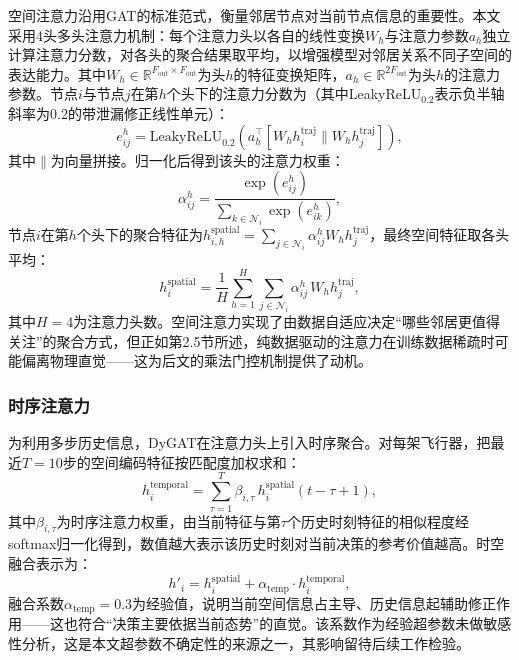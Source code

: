\documentclass[12pt,a4paper,UTF8]{ctexart}
\begin{document}
空间注意力沿用GAT的标准范式，衡量邻居节点对当前节点信息的重要性。本文采用4头多头注意力机制：每个注意力头以各自的线性变换$W_h$与注意力参数$a_h$独立计算注意力分数，对各头的聚合结果取平均，以增强模型对邻居关系不同子空间的表达能力。其中$W_h\in\mathbb{R}^{F_{\text{out}}\times F_{\text{out}}}$为头$h$的特征变换矩阵，$a_h\in\mathbb{R}^{2F_{\text{out}}}$为头$h$的注意力参数。节点$i$与节点$j$在第$h$个头下的注意力分数为（其中LeakyReLU$_{0.2}$表示负半轴斜率为0.2的带泄漏修正线性单元）：
\begin{equation}
    e_{ij}^{h} = \text{LeakyReLU}_{0.2}\!\left(a_h^{\top}[W_h h_i^{\text{traj}} \parallel W_h h_j^{\text{traj}}]\right),
    \label{eq:spatial_score}
\end{equation}
其中$\parallel$为向量拼接。归一化后得到该头的注意力权重：
\begin{equation}
    \alpha_{ij}^{h} = \frac{\exp(e_{ij}^{h})}{\sum_{k\in\mathcal{N}_i}\exp(e_{ik}^{h})},
    \label{eq:spatial_softmax}
\end{equation}
节点$i$在第$h$个头下的聚合特征为$h_{i,h}^{\text{spatial}} = \sum_{j\in\mathcal{N}_i}\alpha_{ij}^{h} W_h h_j^{\text{traj}}$，最终空间特征取各头平均：
\begin{equation}
    h_i^{\text{spatial}} = \frac{1}{H}\sum_{h=1}^{H} \sum_{j\in\mathcal{N}_i}\alpha_{ij}^{h}\, W_h h_j^{\text{traj}},
    \label{eq:spatial_agg}
\end{equation}
其中$H=4$为注意力头数。空间注意力实现了由数据自适应决定“哪些邻居更值得关注”的聚合方式，但正如第2.5节所述，纯数据驱动的注意力在训练数据稀疏时可能偏离物理直觉——这为后文的乘法门控机制提供了动机。

\subsubsection{时序注意力}

为利用多步历史信息，DyGAT在注意力头上引入时序聚合。对每架飞行器，把最近$T=10$步的空间编码特征按匹配度加权求和：
\begin{equation}
    h_i^{\text{temporal}} = \sum_{\tau=1}^{T} \beta_{i,\tau}\, h_i^{\text{spatial}}(t-\tau+1),
    \label{eq:temporal_attn}
\end{equation}
其中$\beta_{i,\tau}$为时序注意力权重，由当前特征与第$\tau$个历史时刻特征的相似程度经softmax归一化得到，数值越大表示该历史时刻对当前决策的参考价值越高。时空融合表示为：
\begin{equation}
    h'_i = h_i^{\text{spatial}} + \alpha_{\text{temp}} \cdot h_i^{\text{temporal}},
    \label{eq:temporal_fusion}
\end{equation}
融合系数$\alpha_{\text{temp}}=0.3$为经验值，说明当前空间信息占主导、历史信息起辅助修正作用——这也符合“决策主要依据当前态势”的直觉。该系数作为经验超参数未做敏感性分析，这是本文超参数不确定性的来源之一，其影响留待后续工作检验。
\end{document}
